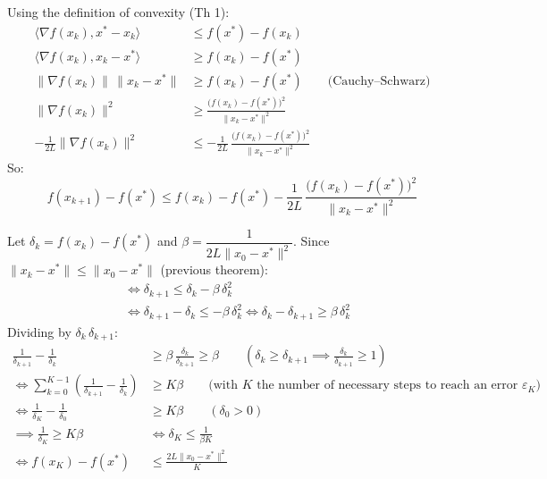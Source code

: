 Using the definition of convexity (Th 1):
\begin{align*}
\bigl\langle\nabla f(x_k),x^*-x_k\bigr\rangle&\le f(x^*)-f(x_k)\\
\bigl\langle\nabla f(x_k),x_k-x^*\bigr\rangle&\ge f(x_k)-f(x^*)\\
\lVert\nabla f(x_k)\rVert\,\lVert x_k-x^*\rVert&\ge f(x_k)-f(x^*)\qquad\text{(Cauchy--Schwarz)}\\
\lVert\nabla f(x_k)\rVert^2&\ge\frac{\bigl(f(x_k)-f(x^*)\bigr)^2}{\lVert x_k-x^*\rVert^2}\\
-\frac{1}{2L}\lVert\nabla f(x_k)\rVert^2&\le-\frac{1}{2L}\,\frac{\bigl(f(x_k)-f(x^*)\bigr)^2}{\lVert x_k-x^*\rVert^2}
\end{align*}
So:
\[
f(x_{k+1})-f(x^*)\le f(x_k)-f(x^*)-\frac{1}{2L}\,\frac{\bigl(f(x_k)-f(x^*)\bigr)^2}{\lVert x_k-x^*\rVert^2}
\]

Let $\delta_k=f(x_k)-f(x^*)$ and $\beta=\dfrac{1}{2L\lVert x_0-x^*\rVert^2}$. Since $\lVert x_k-x^*\rVert\le\lVert x_0-x^*\rVert$ (previous theorem):
\begin{align*}
&\iff \delta_{k+1}\le\delta_k-\beta\,\delta_k^2\\
&\iff \delta_{k+1}-\delta_k\le-\beta\,\delta_k^2\iff\delta_k-\delta_{k+1}\ge\beta\,\delta_k^2
\end{align*}
Dividing by $\delta_k\,\delta_{k+1}$:
\begin{align*}
\frac{1}{\delta_{k+1}}-\frac{1}{\delta_k}&\ge\beta\,\frac{\delta_k}{\delta_{k+1}}\ge\beta\qquad\left(\delta_k\ge\delta_{k+1}\implies\frac{\delta_k}{\delta_{k+1}}\ge1\right)\\
\iff\sum_{k=0}^{K-1}\left(\frac{1}{\delta_{k+1}}-\frac{1}{\delta_k}\right)&\ge K\beta\qquad\text{(with $K$ the number of necessary steps to reach an error $\varepsilon_K$)}\\
\iff\frac{1}{\delta_K}-\frac{1}{\delta_0}&\ge K\beta\qquad(\delta_0>0)\\
\implies\frac{1}{\delta_K}\ge K\beta&\iff\delta_K\le\frac{1}{\beta K}\\
\iff f(x_K)-f(x^*)&\le\frac{2L\lVert x_0-x^*\rVert^2}{K}
\end{align*}

\begin{center}
\end{center}

